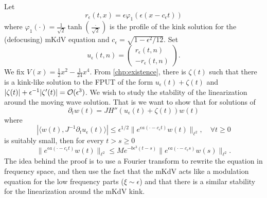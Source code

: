 Let 
\begin{equation}
	r_\epsilon(t,x) = \epsilon \varphi_1(\epsilon (x - c_\epsilon t))
\end{equation}
where \(\varphi_1(\cdot)=  \frac 1 {\sqrt 2 }\tanh(\frac \cdot {\sqrt 2})\) is the profile of the kink solution for the (defocusing) mKdV equation and \(c_\epsilon = \sqrt{1 - \epsilon^2/12}\). Set 
\begin{equation}
	u_{\epsilon} (t,n) = \begin{pmatrix}
		r_\epsilon(t,n) \\
		-r_\epsilon(t,n)
	\end{pmatrix}.
\end{equation}
We fix \(V(x) = \frac 1 2 x^2 - \frac 1 {24} x^4\). From \cref{chp:existence}, there is \(\zeta(t)\) such that there is a kink-like solution to the FPUT of the form \(u_\epsilon(t) + \zeta(t)\) and \(|\zeta(t)| + \epsilon^{-1} |\zeta'(t)| = \mathcal{O}( \epsilon^3)\). We wish to study the stability of the linearization around the moving wave solution. That is we want to show that for solutions of
\begin{equation}\label{linearization-eqn}
	\partial_t w (t) = J H''(u_\epsilon(t) + \zeta(t))w(t)
\end{equation}
where 
\begin{equation}\label{orthogonality-condition}
	|\langle w(t), J^{-1} \partial_t u_{\epsilon} (t) \rangle| \leq \epsilon^{1/2} \| e ^{\epsilon a (\cdot - c_\epsilon t)} w(t) \|_{\ell^2}, \quad \forall t \geq 0
\end{equation}
is suitably small, then for every \(t > s \geq 0\)
\begin{equation}\label{exponential-linear-stability}
	\| e^{\epsilon a(\cdot - c_\epsilon t)} w(t) \|_{\ell^2} \leq M e^{-b\epsilon^3 (t-s)} \| e^{\epsilon a(\cdot - c_\epsilon s)} w(s) \|_{\ell^2} .
\end{equation}
The idea behind the proof is to use a Fourier transform to rewrite the equation in frequency space, and then use the fact that the mKdV acts like a modulation equation for the low frequency parts (\(\xi \sim \epsilon\)) and that there is a similar stability for the linearization around the mKdV kink. 


